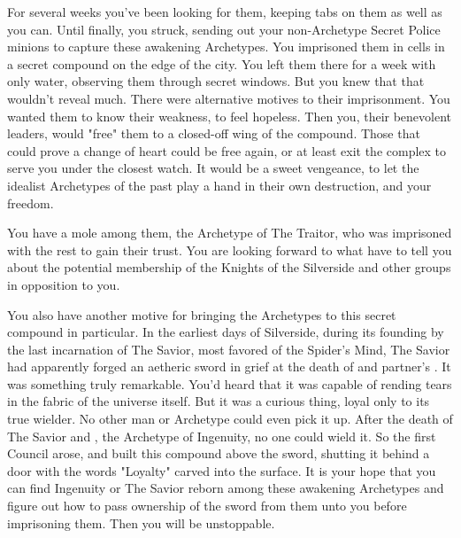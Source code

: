 \documentclass[blue]{Silversiders}
\begin{document}
For several weeks you've been looking for them, keeping tabs on them as well as you can. Until finally, you struck, sending out your non-Archetype Secret Police minions to capture these awakening Archetypes. You imprisoned them in cells in a secret compound on the edge of the city. You left them there for a week with only water, observing them through secret windows. But you knew that that wouldn't reveal much. There were alternative motives to their imprisonment. You wanted them to know their weakness, to feel hopeless. Then you, their benevolent leaders, would "free" them to a closed-off wing of the compound. Those that could prove a change of heart could be free again, or at least exit the complex to serve you under the closest watch. It would be a sweet vengeance, to let the idealist Archetypes of the past play a hand in their own destruction, and your freedom.

You have a mole among them, the Archetype of The Traitor, who was imprisoned with the rest to gain their trust. You are looking forward to what \cTraitor{\they} have to tell you about the potential membership of the Knights of the Silverside and other groups in opposition to you.

You also have another motive for bringing the Archetypes to this secret compound in particular. In the earliest days of Silverside, during its founding by the last incarnation of The Savior, most favored of the Spider's Mind, The Savior had apparently forged an aetheric sword in \cSavior{\their} grief at the death of \cSavior{\their} and \cSavior{\their} partner's \cLoyalty{\offspring}. It was something truly remarkable. You'd heard that it was capable of rending tears in the fabric of the universe itself. But it was a curious thing, loyal only to its true wielder. No other man or Archetype could even pick it up. After the death of The Savior and \cSavior{\their} \cIngenuityOld{\spouse}, the Archetype of Ingenuity, no one could wield it. So the first Council arose, and built this compound above the sword, shutting it behind a door with the words "Loyalty" carved into the surface. It is your hope that you can find Ingenuity or The Savior reborn among these awakening Archetypes and figure out how to pass ownership of the sword from them unto you before imprisoning them. Then you will be unstoppable.
\end{document}
